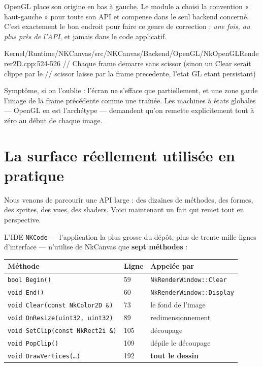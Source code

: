 OpenGL place son origine en bas à gauche. Le module a choisi la convention
« haut-gauche » pour toute son API et compense dans le seul backend concerné.
C'est exactement le bon endroit pour faire ce genre de correction : \emph{une
fois, au plus près de l'API}, et jamais dans le code applicatif.

\begin{nkpiege}
\begin{nkcode}{Kernel/Runtime/NKCanvas/src/NKCanvas/Backend/OpenGL/NkOpenGLRenderer2D.cpp:524-526}
// Chaque frame demarre sans scissor (sinon un Clear serait clippe par le
// scissor laisse par la frame precedente, l'etat GL etant persistant)
\end{nkcode}
Symptôme, si on l'oublie : l'écran ne s'efface que partiellement, et une zone
garde l'image de la frame précédente comme une traînée. Les machines à états
globales — OpenGL en est l'archétype — demandent qu'on remette explicitement
tout à zéro au début de chaque image.
\end{nkpiege}

\section{La surface réellement utilisée en pratique}

Nous venons de parcourir une API large : des dizaines de méthodes, des formes,
des sprites, des vues, des shaders. Voici maintenant un fait qui remet tout en
perspective.

L'IDE \texttt{NKCode} — l'application la plus grosse du dépôt, plus de trente
mille lignes d'interface — n'utilise de NkCanvas que \textbf{sept méthodes} :

\begin{center}
\begin{tabular}{@{}lll@{}}
\toprule
\textbf{Méthode} & \textbf{Ligne} & \textbf{Appelée par} \\
\midrule
\texttt{bool Begin()}                  & 59  & \texttt{NkRenderWindow::Clear} \\
\texttt{void End()}                    & 60  & \texttt{NkRenderWindow::Display} \\
\texttt{void Clear(const NkColor2D \&)} & 73  & le fond de l'image \\
\texttt{void OnResize(uint32, uint32)} & 89  & redimensionnement \\
\texttt{void SetClip(const NkRect2i \&)} & 105 & découpage \\
\texttt{void PopClip()}                & 109 & dépile le découpage \\
\texttt{void DrawVertices(\dots)}      & 192 & \textbf{tout le dessin} \\
\bottomrule
\end{tabular}
\end{center}

